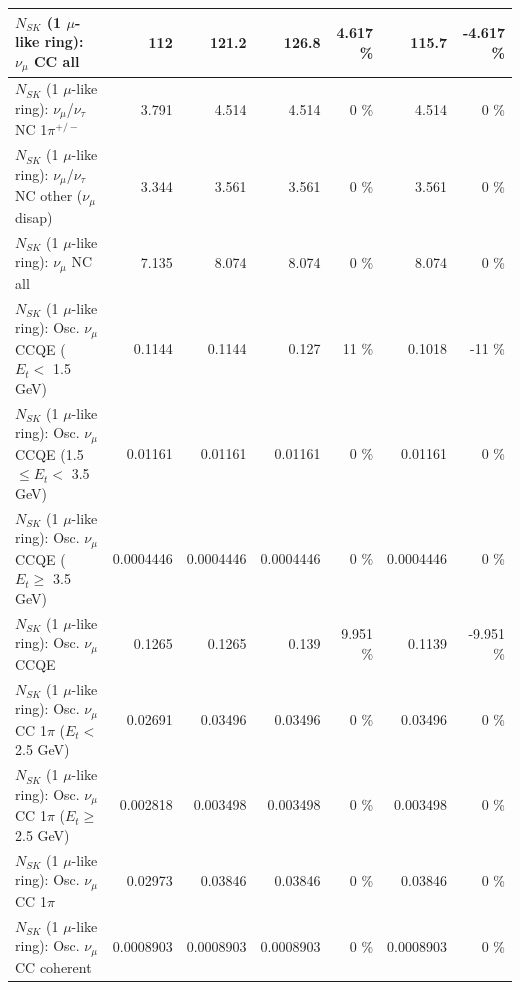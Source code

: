 \begin{table}
\begin{tabular}{| l | r | r | r  r | r  r |}
                                $N_{SK}$ (1 $\mu$-like ring): $\nu_{\mu}$ CC all &             112 &           121.2 &           126.8 &    4.617 \%  &           115.7 &   -4.617 \%  \\ 
\hline
              $N_{SK}$ (1 $\mu$-like ring): $\nu_\mu$/$\nu_\tau$ NC 1$\pi^{+/-}$ &           3.791 &           4.514 &           4.514 &        0 \%  &           4.514 &        0 \%  \\ 
   $N_{SK}$ (1 $\mu$-like ring): $\nu_\mu$/$\nu_\tau$ NC other ($\nu_\mu$ disap) &           3.344 &           3.561 &           3.561 &        0 \%  &           3.561 &        0 \%  \\ 
                                $N_{SK}$ (1 $\mu$-like ring): $\nu_{\mu}$ NC all &           7.135 &           8.074 &           8.074 &        0 \%  &           8.074 &        0 \%  \\ 
\hline
\hline
           $N_{SK}$ (1 $\mu$-like ring): Osc. $\nu_\mu$ CCQE ($E_{t} <$ 1.5 GeV) &          0.1144 &          0.1144 &           0.127 &       11 \%  &          0.1018 &      -11 \%  \\ 
  $N_{SK}$ (1 $\mu$-like ring): Osc. $\nu_\mu$ CCQE (1.5 $\leq E_{t} <$ 3.5 GeV) &         0.01161 &         0.01161 &         0.01161 &        0 \%  &         0.01161 &        0 \%  \\ 
        $N_{SK}$ (1 $\mu$-like ring): Osc. $\nu_\mu$ CCQE ($E_{t} \geq$ 3.5 GeV) &       0.0004446 &       0.0004446 &       0.0004446 &        0 \%  &       0.0004446 &        0 \%  \\ 
\hline
                               $N_{SK}$ (1 $\mu$-like ring): Osc. $\nu_\mu$ CCQE &          0.1265 &          0.1265 &           0.139 &    9.951 \%  &          0.1139 &   -9.951 \%  \\ 
\hline
      $N_{SK}$ (1 $\mu$-like ring): Osc. $\nu_\mu$ CC 1$\pi$ ($E_{t} <$ 2.5 GeV) &         0.02691 &         0.03496 &         0.03496 &        0 \%  &         0.03496 &        0 \%  \\ 
   $N_{SK}$ (1 $\mu$-like ring): Osc. $\nu_\mu$ CC 1$\pi$ ($E_{t} \geq$ 2.5 GeV) &        0.002818 &        0.003498 &        0.003498 &        0 \%  &        0.003498 &        0 \%  \\ 
\hline
                          $N_{SK}$ (1 $\mu$-like ring): Osc. $\nu_\mu$ CC 1$\pi$ &         0.02973 &         0.03846 &         0.03846 &        0 \%  &         0.03846 &        0 \%  \\ 
                        $N_{SK}$ (1 $\mu$-like ring): Osc. $\nu_\mu$ CC coherent &       0.0008903 &       0.0008903 &       0.0008903 &        0 \%  &       0.0008903 &        0 \%  \\ 

\end{tabular}
\end{table}
